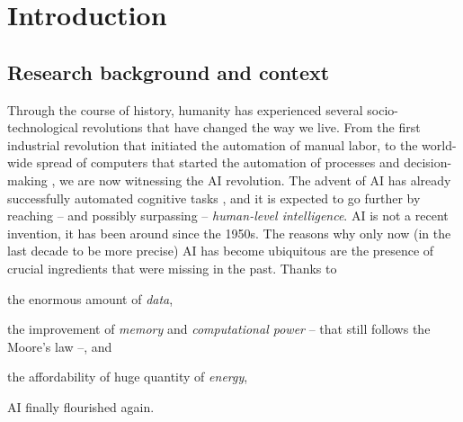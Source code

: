 
\chapter{Introduction}
\label{ch:introduction}
\mtcaddchapter
\minitoc

\begin{refsection}

\section{Research background and context}
\label{sec:research-background-and-context}
%
Through the course of history, humanity has experienced several socio-technological revolutions that have changed the way we live.
%
From the first industrial revolution that initiated the automation of manual labor, to the world-wide spread of computers that started the automation of processes and decision-making , we are now witnessing the \ac{AI} revolution.
%
The advent of \ac{AI} has already successfully automated cognitive tasks , and it is expected to go further by reaching -- and possibly surpassing -- \emph{human-level intelligence}.
%
\Ac{AI} is not a recent invention, it has been around since the 1950s.
%
The reasons why only now (in the last decade to be more precise) \ac{AI} has become ubiquitous are the presence of crucial ingredients that were missing in the past.
%
Thanks to
%
\begin{inlinelist}
    \item the enormous amount of \emph{data},
    \item the improvement of \emph{memory} and \emph{computational power} -- that still follows the Moore's law --, and
    \item the affordability of huge quantity of \emph{energy},
\end{inlinelist}
%
\ac{AI} finally flourished again.



\end{refsection}
